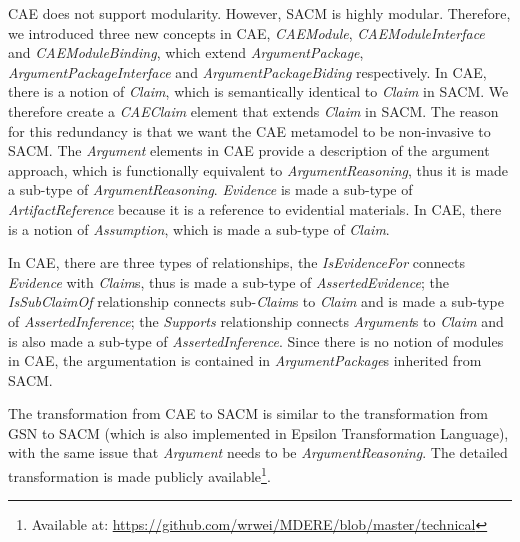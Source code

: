 CAE does not support modularity.
However, SACM is highly modular.
Therefore, we introduced three new concepts in CAE, \textit{CAEModule}, \textit{CAEModuleInterface} and \textit{CAEModuleBinding}, which extend \textit{ArgumentPackage}, \textit{ArgumentPackageInterface} and \textit{ArgumentPackageBiding} respectively.
In CAE, there is a notion of \textit{Claim}, which is semantically identical to \textit{Claim} in SACM. 
We therefore create a \textit{CAEClaim} element that extends \textit{Claim} in SACM. 
The reason for this redundancy is that we want the CAE metamodel to be non-invasive to SACM. 
The \textit{Argument} elements in CAE provide a description of the argument approach, which is functionally equivalent to \textit{ArgumentReasoning}, thus it is made a sub-type of \textit{ArgumentReasoning}.
\textit{Evidence} is made a sub-type of \textit{ArtifactReference} because it is a reference to evidential materials. 
In CAE, there is a notion of \textit{Assumption}, which is made a sub-type of \textit{Claim}. 

In CAE, there are three types of relationships, the \textit{IsEvidenceFor} connects \textit{Evidence} with \textit{Claim}s, thus is made a sub-type of \textit{AssertedEvidence}; the \textit{IsSubClaimOf} relationship connects sub-\textit{Claim}s to \textit{Claim} and is made a sub-type of \textit{AssertedInference}; the \textit{Supports} relationship connects \textit{Argument}s to \textit{Claim} and is also made a sub-type of \textit{AssertedInference}. 
Since there is no notion of modules in CAE, the argumentation is contained in \textit{ArgumentPackage}s inherited from SACM.

The transformation from CAE to SACM is similar to the transformation from GSN to SACM (which is also implemented in Epsilon Transformation Language), with the same issue that \textit{Argument} needs to be \textit{ArgumentReasoning}. 
The detailed transformation is made publicly available\footnote{Available at: \url{https://github.com/wrwei/MDERE/blob/master/technical}}.



